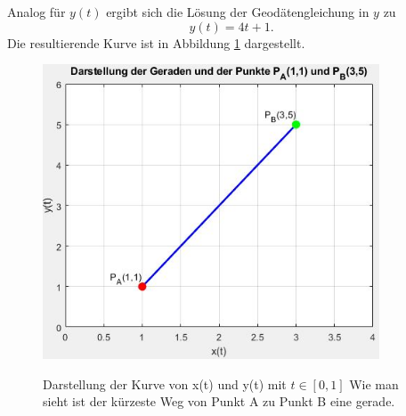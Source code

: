 Analog für $y(t)$ ergibt sich die Lösung der Geodätengleichung in $y$ zu
\begin{equation}
	y(t) = 4t + 1 .
	\label{geodaeten:equation:StaKartesisch:LoesungY}
\end{equation}
Die resultierende Kurve ist in Abbildung
\ref{geodaeten:figure:Standardverfahren:Kartesisch:figure1} dargestellt.
\begin{figure}
	\centering
	\includegraphics[width=10cm]{papers/geodaeten/Abbildungen/Standardverfahren/Kartesisch}
	\label{geodaeten:figure:Standardverfahren:Kartesisch:figure1}
	\caption{Darstellung der Kurve von x(t) und y(t) mit $t \in [0 , 1]$ Wie man sieht ist der kürzeste Weg von Punkt A zu Punkt B eine gerade.}
\end{figure}
